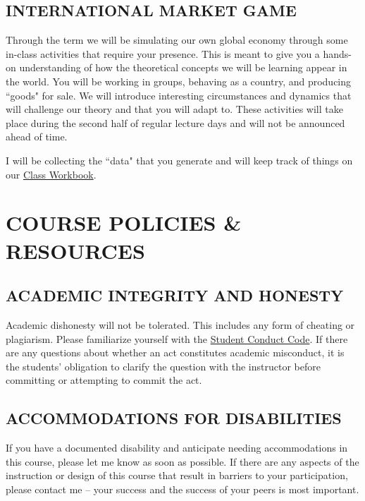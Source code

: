 \documentclass[11pt]{article}
\begin{document}
\subsection*{INTERNATIONAL MARKET GAME}

Through the term we will be simulating our own global economy through some in-class activities that require your presence.   
This is meant to give you a hands-on understanding of how the theoretical concepts we will be learning appear in the world. 
You will be working in groups, behaving as a country, and producing ``goods" for sale.
We will introduce interesting circumstances and dynamics that will challenge our theory and that you will adapt to. 
These activities will take place during the second half of regular lecture days and will not be announced ahead of time. 

I will be collecting the ``data" that you generate and will keep track of things on our \href{https://jose-rojas-fallas.quarto.pub/international-econ-workbook/}{Class Workbook}.  

\bigskip \bigskip 

\section*{COURSE POLICIES \& RESOURCES}

\subsection*{ACADEMIC INTEGRITY AND HONESTY}
Academic dishonesty will not be tolerated.
This includes any form of cheating or plagiarism.
Please familiarize yourself with the \href{https://policies.uoregon.edu/vol-3-administration-student-affairs/ch-1-conduct/student-conduct-code}{Student Conduct Code}.
If there are any questions about whether an act constitutes academic misconduct, it is the students' obligation to clarify the question with the instructor before committing or attempting to commit the act.

\subsection*{ACCOMMODATIONS FOR DISABILITIES}
If you have a documented disability and anticipate needing accommodations in this course, please let me know as soon as possible.
If there are any aspects of the instruction or design of this course that result in barriers to your participation, please contact me -- your success and the success of your peers is most important. 
\end{document}
